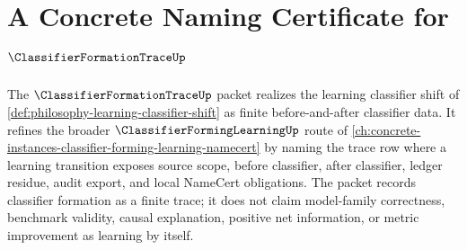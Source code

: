 \chapter{A Concrete Naming Certificate for $\ClassifierFormationTraceUp$}
\label{ch:concrete-instances-classifier-formation-trace-namecert}

The $\ClassifierFormationTraceUp$ packet realizes the learning classifier shift of \autoref{def:philosophy-learning-classifier-shift} as finite before-and-after classifier data. It refines the broader $\ClassifierFormingLearningUp$ route of \autoref{ch:concrete-instances-classifier-forming-learning-namecert} by naming the trace row where a learning transition exposes source scope, before classifier, after classifier, ledger residue, audit export, and local NameCert obligations. The packet records classifier formation as a finite trace; it does not claim model-family correctness, benchmark validity, causal explanation, positive net information, or metric improvement as learning by itself.

